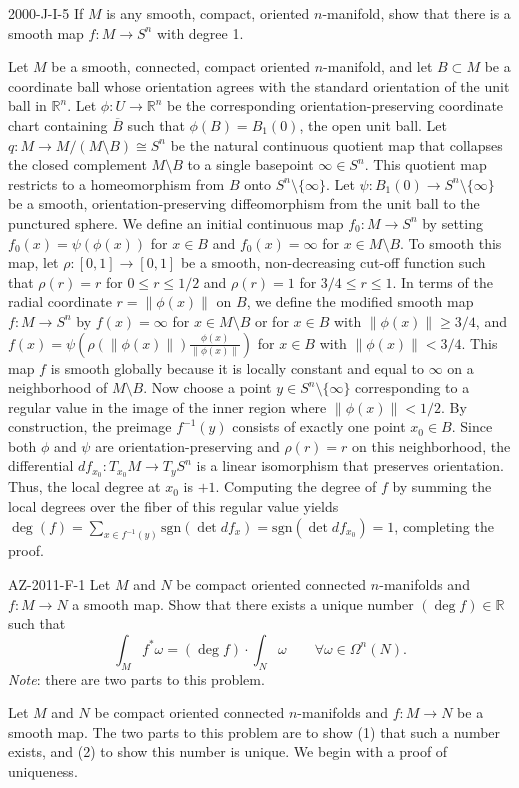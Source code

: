 \documentclass{article}
\begin{document}
	\begin{prb}{2000-J-I-5}
		If $M$ is any smooth, compact, oriented $n$-manifold, show that there is a smooth map $f: M \to S^n$ with degree 1.
		\label{prb:2000JI5}
	\end{prb}
	Let $M$ be a smooth, connected, compact oriented $n$-manifold, and let $B \subset M$ be a coordinate ball whose orientation agrees with the standard orientation of the unit ball in $\mathbb{R}^n$. Let $\phi: U \to \mathbb{R}^n$ be the corresponding orientation-preserving coordinate chart containing $\overline{B}$ such that $\phi(B) = B_1(0)$, the open unit ball. Let $q: M \to M / (M \setminus B) \cong S^n$ be the natural continuous quotient map that collapses the closed complement $M \setminus B$ to a single basepoint $\infty \in S^n$. This quotient map restricts to a homeomorphism from $B$ onto $S^n \setminus \{\infty\}$. Let $\psi: B_1(0) \to S^n \setminus \{\infty\}$ be a smooth, orientation-preserving diffeomorphism from the unit ball to the punctured sphere. We define an initial continuous map $f_0: M \to S^n$ by setting $f_0(x) = \psi(\phi(x))$ for $x \in B$ and $f_0(x) = \infty$ for $x \in M \setminus B$. To smooth this map, let $\rho: [0, 1] \to [0, 1]$ be a smooth, non-decreasing cut-off function such that $\rho(r) = r$ for $0 \leq r \leq 1/2$ and $\rho(r) = 1$ for $3/4 \leq r \leq 1$. In terms of the radial coordinate $r = \|\phi(x)\|$ on $B$, we define the modified smooth map $f: M \to S^n$ by $f(x) = \infty$ for $x \in M \setminus B$ or for $x \in B$ with $\|\phi(x)\| \geq 3/4$, and $f(x) = \psi\left(\rho(\|\phi(x)\|) \frac{\phi(x)}{\|\phi(x)\|}\right)$ for $x \in B$ with $\|\phi(x)\| < 3/4$. This map $f$ is smooth globally because it is locally constant and equal to $\infty$ on a neighborhood of $M \setminus B$. Now choose a point $y \in S^n \setminus \{\infty\}$ corresponding to a regular value in the image of the inner region where $\|\phi(x)\| < 1/2$. By construction, the preimage $f^{-1}(y)$ consists of exactly one point $x_0 \in B$. Since both $\phi$ and $\psi$ are orientation-preserving and $\rho(r)=r$ on this neighborhood, the differential $df_{x_0}: T_{x_0}M \to T_y S^n$ is a linear isomorphism that preserves orientation. Thus, the local degree at $x_0$ is $+1$. Computing the degree of $f$ by summing the local degrees over the fiber of this regular value yields $\deg(f) = \sum_{x \in f^{-1}(y)} \text{sgn}(\det df_x) = \text{sgn}(\det df_{x_0}) = 1$, completing the proof.
	
	
	\begin{prb}{AZ-2011-F-1}
		Let $M$ and $N$ be compact oriented connected $n$-manifolds and $f: M \to N$ a smooth map. Show that there exists a unique number $(\deg{f}) \in \mathbb{R}$ such that 
		\begin{equation*}
			\int_{M}f^{\ast}\omega = (\deg{f}) \cdot \int_{N}\omega \qquad \forall \omega \in \Omega^{n}(N). 
		\end{equation*}
	\textit{Note}: there are two parts to this problem. 
	\end{prb}
	Let $M$ and $N$ be compact oriented connected $n$-manifolds and $f: M \to N$ be a smooth map. The two parts to this problem are to show (1) that such a number exists, and (2) to show this number is unique. We begin with a proof of uniqueness. 
	
\end{document}
